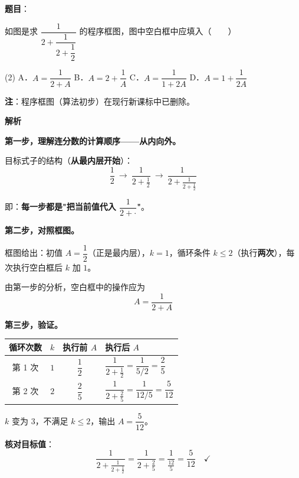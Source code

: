 \begin{answer}

\textbf{题目}：

如图是求 $\dfrac1{2+\dfrac1{2+\dfrac12}}$ 的程序框图，图中空白框中应填入\mbox{（　　）}
\nopagebreak[4]
\begin{center}\end{center}
\nopagebreak[4]
\begin{gkopts}(2)
\task A．$A=\dfrac1{2+A}$
\task B．$A=2+\dfrac1A$
\task C．$A=\dfrac1{1+2A}$
\task D．$A=1+\dfrac1{2A}$
\end{gkopts}

\begin{gktip}
\textbf{注}：程序框图（算法初步）在现行新课标中已删除。
\end{gktip}

\textbf{解析}

\textbf{第一步，理解连分数的计算顺序——从内向外。}

目标式子的结构（\textbf{从最内层开始}）：
\nopagebreak[4]
\[\frac12\ \longrightarrow\ \frac1{2+\frac12}\ \longrightarrow\ \frac1{2+\frac1{2+\frac12}}\]

即：\textbf{每一步都是"把当前值代入 $\dfrac1{2+\cdot}$"}。

\textbf{第二步，对照框图。}

框图给出：初值 $A=\dfrac12$（正是最内层），$k=1$，循环条件 $k\le2$（执行\textbf{两次}），每次执行空白框后 $k$ 加 $1$。

由第一步的分析，空白框中的操作应为
\nopagebreak[4]
\[A=\frac1{2+A}\]

\textbf{第三步，验证。}

\begin{center}
\begin{tabular}{cccl}
\toprule
循环次数 & $k$ & 执行前 $A$ & 执行后 $A$ \\
\midrule
第 1 次 & $1$ & $\dfrac12$ & $\dfrac1{2+\frac12}=\dfrac1{5/2}=\dfrac25$ \\
第 2 次 & $2$ & $\dfrac25$ & $\dfrac1{2+\frac25}=\dfrac1{12/5}=\dfrac5{12}$ \\
\bottomrule
\end{tabular}
\end{center}

$k$ 变为 $3$，不满足 $k\le2$，输出 $A=\dfrac5{12}$。

\textbf{核对目标值}：
\nopagebreak[4]
\[\frac1{2+\frac1{2+\frac12}}=\frac1{2+\frac25}=\frac1{\frac{12}5}=\frac5{12}\quad\checkmark\]


\end{answer}
